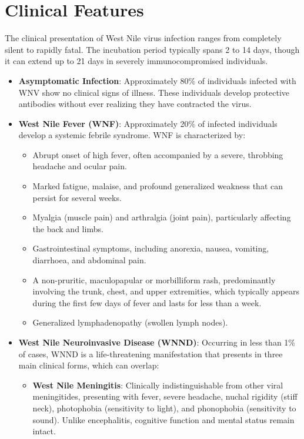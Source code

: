 \section*{Clinical Features}
The clinical presentation of West Nile virus infection ranges from completely silent to rapidly fatal. The incubation period typically spans 2 to 14 days, though it can extend up to 21 days in severely immunocompromised individuals.
\begin{itemize}
    \item \textbf{Asymptomatic Infection}: Approximately 80\% of individuals infected with WNV show no clinical signs of illness. These individuals develop protective antibodies without ever realizing they have contracted the virus.
    \item \textbf{West Nile Fever (WNF)}: Approximately 20\% of infected individuals develop a systemic febrile syndrome. WNF is characterized by:
    \begin{itemize}
        \item Abrupt onset of high fever, often accompanied by a severe, throbbing headache and ocular pain.
        \item Marked fatigue, malaise, and profound generalized weakness that can persist for several weeks.
        \item Myalgia (muscle pain) and arthralgia (joint pain), particularly affecting the back and limbs.
        \item Gastrointestinal symptoms, including anorexia, nausea, vomiting, diarrhoea, and abdominal pain.
        \item A non-pruritic, maculopapular or morbilliform rash, predominantly involving the trunk, chest, and upper extremities, which typically appears during the first few days of fever and lasts for less than a week.
        \item Generalized lymphadenopathy (swollen lymph nodes).
    \end{itemize}
    \item \textbf{West Nile Neuroinvasive Disease (WNND)}: Occurring in less than 1\% of cases, WNND is a life-threatening manifestation that presents in three main clinical forms, which can overlap:
    \begin{itemize}
        \item \textbf{West Nile Meningitis}: Clinically indistinguishable from other viral meningitides, presenting with fever, severe headache, nuchal rigidity (stiff neck), photophobia (sensitivity to light), and phonophobia (sensitivity to sound). Unlike encephalitis, cognitive function and mental status remain intact.

\end{itemize}
\end{itemize}
